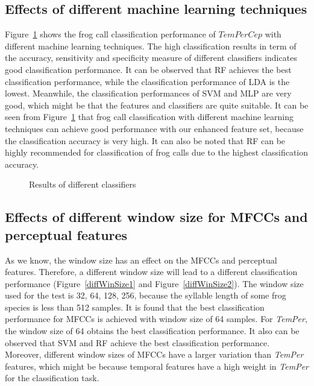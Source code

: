 \subsection{Effects of different machine learning techniques}
Figure~\ref{diffClassifier} shows the frog call classification performance of 
$TemPerCep$ with different machine learning techniques. The high classification results in term of the accuracy, sensitivity and specificity measure of different classifiers indicates good classification performance. It can be observed that RF achieves the best classification performance, while the classification performance of LDA is the lowest. Meanwhile, the classification performances of SVM and MLP are very good, which might be that the features and classifiers are quite suitable. It can be seen from Figure~\ref{diffClassifier} that frog call classification with different machine learning techniques can achieve good performance with our enhanced feature set, because the classification accuracy is very high. It can also be noted that RF can be highly recommended for classification of frog calls due to the highest classification accuracy.



\begin{figure}[htb!] %
\caption{Results of different classifiers}
\label{diffClassifier} 
\end{figure}



\subsection{Effects of different window size for MFCCs and perceptual features}
As we know, the window size has an effect on the MFCCs and perceptual features. Therefore, a different window size will lead to a different classification performance (Figure~\ref{diffWinSize1} and Figure~\ref{diffWinSize2}). The window size used for the test is 32, 64, 128, 256, because the syllable length of some frog species is less than 512 samples.
It is found that the best classification performance for MFCCs is achieved with window size of 64 samples. For \textit{TemPer}, the window size of 64 obtains the best classification performance. 
It also can be observed that SVM and RF achieve the best classification performance. Moreover, different window sizes of MFCCs have a larger variation than \textit{TemPer} features, which might be because temporal features have a high weight in \textit{TemPer} for the classification task.

